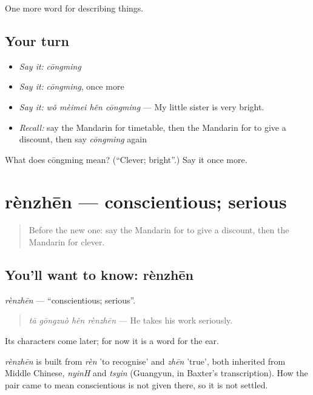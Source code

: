 \begin{grammarlens}[title={What you've built}]
One more word for describing things.
\end{grammarlens}

\subsection*{Your turn}
\begin{itemize}
\raggedright
  \item \emph{Say it:} \emph{cōngming}
  \item \emph{Say it:} \emph{cōngming}, once more
  \item \emph{Say it:} \emph{wǒ mèimei hěn cōngming} — My little sister is very bright.
  \item \emph{Recall:} say the Mandarin for timetable, then the Mandarin for to give a discount, then say \emph{cōngming} again
\end{itemize}

\begin{tcolorbox}[breakable,colback=teal!4,colframe=teal!35!black,title={Before you move on}]
What does cōngming mean? (\textquotedblleft{}Clever; bright\textquotedblright{}.) Say it once more.
\end{tcolorbox}
\section[rènzhēn]{rènzhēn — conscientious; serious}

\label{lesson:ZH-C123-renzhen}



\begin{quote}
Before the new one: say the Mandarin for to give a discount, then the Mandarin for clever.
\end{quote}

\subsection*{You'll want to know: rènzhēn}
\emph{rènzhēn} — \textquotedblleft{}conscientious; serious\textquotedblright{}.

\begin{quote}
\emph{tā gōngzuò hěn rènzhēn} — He takes his work seriously.
\end{quote}

Its characters come later; for now it is a word for the ear.

\begin{cousinweb}
\emph{rènzhēn} is built from \emph{rèn} 'to recognise' and \emph{zhēn} 'true', both inherited from Middle Chinese, \emph{nyinH} and \emph{tsyin} (Guangyun, in Baxter's transcription). How the pair came to mean conscientious is not given there, so it is not settled.
\end{cousinweb}

